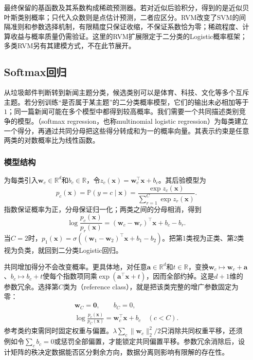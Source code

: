 最终保留的基函数及其系数构成稀疏预测器。若对近似后验积分，得到的是近似贝叶斯类别概率；只代入众数则是点估计预测，二者应区分。RVM改变了SVM的间隔准则和参数选择机制，有限精度只保证收缩，不保证系数恰为零；稀疏程度、计算收益与概率质量仍需验证。这里的RVM扩展限定于二分类的Logistic概率框架；多类RVM另有其建模方式，不在此节展开。

\subsection{Softmax回归}
\label{sec:classification-softmax}

从垃圾邮件判断转到新闻主题分类，候选类别可以是体育、科技、文化等多个互斥主题。若分别训练“是否属于某主题”的二分类概率模型，它们的输出未必相加等于$1$；同一篇新闻可能在多个模型中都得到较高概率。我们需要一个共同描述类别竞争的模型。（softmax regression，也称multinomial logistic regression）为每类建立一个得分，再通过共同分母把这些得分转成和为一的概率向量。其表示约束是任意两类的对数概率比为线性函数。

\subsubsection{模型结构}
\label{sec:classification-softmax-structure}

为每类引入$\bm{w}_c\in\mathbb{R}^{d}$和$b_c\in\mathbb{R}$，令$z_c(\bm{x})=\bm{w}_c^{\top}\bm{x}+b_c$。其后验模型为
\begin{equation}
  \label{eq:classification-softmax-model}
  p_c(\bm{x})
  =\mathbb{P}(y=c\mid\bm{x})
  =\frac{\exp z_c(\bm{x})}
         {\sum_{r=1}^{C}\exp z_r(\bm{x})}.
\end{equation}
指数保证概率为正，分母保证归一化；两类之间的分母相消，得到
\[
  \log\frac{p_c(\bm{x})}{p_r(\bm{x})}
  =(\bm{w}_c-\bm{w}_r)^{\top}\bm{x}+b_c-b_r.
\]
当$C=2$时，$p_1(\bm{x})=\sigma((\bm{w}_1-\bm{w}_2)^{\top}\bm{x}+b_1-b_2)$。把第1类视为正类、第2类视为负类，就回到二分类Logistic回归。

共同增加得分不会改变概率。更具体地，对任意$\bm{a}\in\mathbb{R}^{d}$和$t\in\mathbb{R}$，变换$\bm{w}_c\mapsto\bm{w}_c+\bm{a}$、$b_c\mapsto b_c+t$使每个指数项同乘$\exp(\bm{a}^{\top}\bm{x}+t)$，因而全部约掉。这是$d+1$维的参数冗余。选择第$C$类为（reference class），就是把该类完整的增广参数固定为零：
\begin{equation}
  \label{eq:classification-softmax-reference}
  \begin{gathered}
    \bm{w}_C=\bm{0},\qquad b_C=0,\\
    \log\frac{p_c(\bm{x})}{p_C(\bm{x})}
    =\bm{w}_c^{\top}\bm{x}+b_c
    \quad(c<C).
  \end{gathered}
\end{equation}
参考类约束需同时固定权重与偏置。$\lambda\sum_c\lVert\bm{w}_c\rVert_2^2/2$只消除共同权重平移，还须例如令$\sum_c b_c=0$或惩罚全部偏置，才能锁定共同偏置平移。参数冗余消除后，设计矩阵的秩决定数据能否区分剩余方向，数据分离则影响有限解的存在性。


